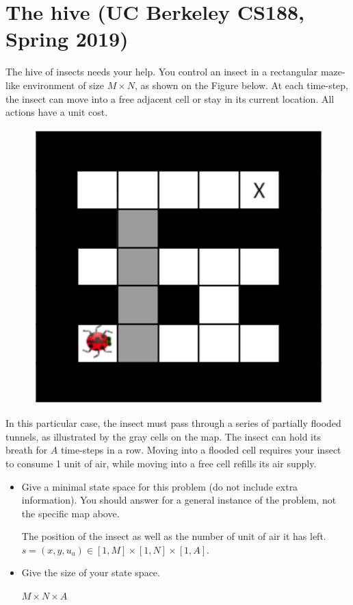 \documentclass[11pt, a4paper]{article}
\begin{document}
\newpage

\section{The hive (UC Berkeley CS188, Spring 2019)}

The hive of insects needs your help. You control an insect in a rectangular maze-like environment of size $M \times N$, as shown on the Figure below. At each time-step, the insect can move into a free adjacent cell or stay in its current location. All actions have a unit cost.

\begin{figure}[h]
    \centering
    \includegraphics[width=0.3\linewidth]{figures/e1_hive.png}
\end{figure}

In this particular case, the insect must pass through a series of partially flooded tunnels, as illustrated by the gray cells on the map. The insect can hold its breath for $A$ time-steps in a row. Moving into a flooded cell requires your insect to consume 1 unit of air, while moving into a free cell refills its air supply.

\begin{itemize}
    \item Give a minimal state space for this problem (do not include extra information). You should answer for a general instance of the problem, not the specific map above.

    \begin{solution}
        The position of the insect  as well as the number of unit of air it has left. $s = (x, y, u_a) \in [1, M] \times [1, N] \times [1, A]$.
    \end{solution}

    \item Give the size of your state space.

    \begin{solution}
        $M\times N \times A$
    \end{solution}
\end{itemize}
\end{document}
